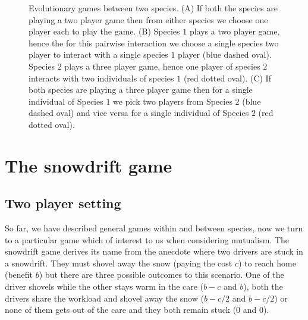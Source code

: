 \documentclass[12pt]{article}
\begin{document}
\begin{figure}
\begin{center}
\end{center}
\caption{
Evolutionary games between two species.
(A) If both the species are playing a two player game then from either species we choose one player each to play the game.
(B) Species $1$ plays a two player game, hence the for this pairwise interaction we choose a single species two player to interact with a single species $1$ player (blue dashed oval). Species $2$ plays a three player game, hence one player of species $2$ interacts with two individuals of species $1$ (red dotted oval).
(C) If both species are playing a three player game then for a single individual of Species $1$ we pick two players from Species $2$ (blue dashed oval) and vice versa for a single individual of Species $2$ (red dotted oval).
}
\label{fig:concept}
\end{figure}




\section*{The snowdrift game}
\label{appA}
\subsection*{Two player setting}
So far, we have described general games within and between species, now we turn to a particular game which of interest to us when considering mutualism.
The snowdrift game derives its name from the anecdote where two drivers are stuck in a snowdrift.
They must shovel away the snow (paying the cost $c$) to reach home (benefit $b$) but there are three possible outcomes to this scenario.
One of the driver shovels while the other stays warm in the care ($b-c$ and $b$), both the drivers share the workload and shovel away the snow ($b-c/2$ and $b-c/2$) or none of them gets out of the care and they both remain stuck ($0$ and $0$).
\end{document}
